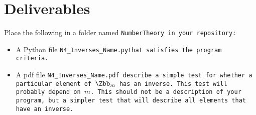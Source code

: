 \documentclass{article}
\newcommand\foldername{\tt{NumberTheory} }
\newcommand\filename{\tt{N4\_Inverses\_Name.py}\;\;}
\begin{document}
\section*{Deliverables}
	
	
	Place the following in a folder named \foldername in your repository:
	\begin{itemize}
		\item A Python file \filename  that satisfies the program criteria.
		\item A pdf file \tt{N4\_Inverses\_Name.pdf} describe a simple test for whether a particular element of $\Zbb_m$ has an inverse.  This test will probably depend on $m$.  This should not be a description of your program, but a simpler test that will describe all elements that have an inverse.
	\end{itemize}

	
\end{document}
